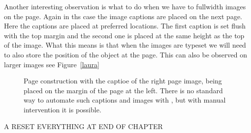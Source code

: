 Another interesting observation is what to do when we have to fullwidth images on the page. Again in ths case the image captions are placed on the next page. Here the captions are placed at preferred locations. The first caption
is set flush with the top margin and the second one is placed at the same height as the top of the image. What this means is that when the images are typeset we will  need to also store the position of the object at the page. This can also be observed on larger images see Figure~\ref{laura}

\begin{figure}[tbp]
\caption{Page construction with the captioe  of the right page image, being placed on the margin of the page at the left. There is no standard way to automate such captions and images with \latexe, but with manual
intervention it is possible.}
\label{elizabeth}
\makeatletter


\end{figure}

\restoregeometry
A RESET EVERYTHING AT END OF CHAPTER


\addtocounter{chapter}{-2}
\@toctrue\@specialtrue

\makeatother